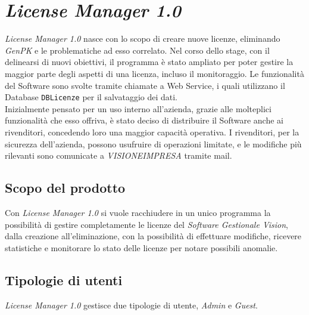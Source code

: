 
\chapter{\textit{License Manager 1.0}}
\label{cap:license-manager}

\textit{License Manager 1.0} nasce con lo scopo di creare nuove licenze, eliminando \textit{GenPK} e le problematiche ad esso correlato. Nel corso dello stage, con il delinearsi di nuovi obiettivi, il programma è stato ampliato per poter gestire la maggior parte degli aspetti di una licenza, incluso il monitoraggio. Le funzionalità del Software sono svolte tramite chiamate a Web Service, i quali utilizzano il Database \texttt{DBLicenze} per il salvataggio dei dati.
\\
Inizialmente pensato per un uso interno all'azienda, grazie alle molteplici funzionalità che esso offriva, è stato deciso di distribuire il Software anche ai rivenditori, concedendo loro una maggior capacità operativa.
I rivenditori, per la sicurezza dell'azienda, possono usufruire di operazioni limitate, e le modifiche più rilevanti sono comunicate a \textit{VISIONEIMPRESA} tramite mail.


\section{Scopo del prodotto}

Con \textit{License Manager 1.0} si vuole racchiudere in un unico programma la possibilità di gestire completamente le licenze del \textit{Software Gestionale Vision}, dalla creazione all'eliminazione, con la possibilità di effettuare modifiche, ricevere statistiche e monitorare lo stato delle licenze per notare possibili anomalie. 


\section{Tipologie di utenti}

\textit{License Manager 1.0} gestisce due tipologie di utente, \textit{Admin} e \textit{Guest}.

